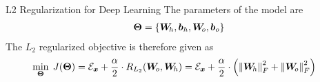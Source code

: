 \begin{frame}{L2 Regularization for Deep Learning}
%
%
The parameters of the model are 
\begin{align*}
    {\bm \Theta} = \left\{ {\boldsymbol W}_{\!h}, {\boldsymbol b}_{h}, {\boldsymbol W}_{\!o},
    {\boldsymbol b}_{o}\right\}
\end{align*}
The $L_2$ regularized objective is therefore given as
\begin{align*}
    \min_{{\bm \Theta}} \; J({\bm \Theta}) & =  {\mathcal E}_{{\boldsymbol x}} + \frac{\alpha}{2} \cdot
    R_{L_2}({\boldsymbol W}_{\!o}, {\boldsymbol W}_{\!h}) = 
    {\mathcal E}_{{\boldsymbol x}} +
     \frac{\alpha}{2} \cdot \left( \left\lVert{\boldsymbol W}_{\!h}\right\rVert_{F}^2 + \left\lVert{\boldsymbol W}_{\!o}\right\rVert_{F}^2
    \right)
\end{align*}

\end{frame}
